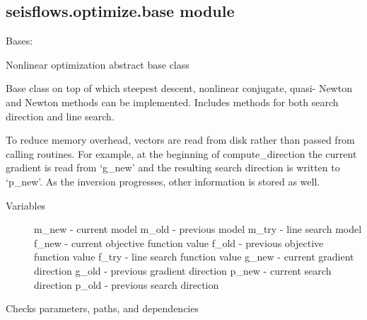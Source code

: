 \documentclass[letterpaper,10pt,english]{sphinxmanual}
\begin{document}
\subsection{seisflows.optimize.base module}
\label{\detokenize{ref/seisflows.optimize:module-seisflows.optimize.base}}\label{\detokenize{ref/seisflows.optimize:seisflows-optimize-base-module}}

\begin{fulllineitems}
\label{\detokenize{ref/seisflows.optimize:seisflows.optimize.base.base}}
Bases: 

Nonlinear optimization abstract base class

Base class on top of which steepest descent, nonlinear conjugate, quasi-
Newton and Newton methods can be implemented.  Includes methods for
both search direction and line search.

To reduce memory overhead, vectors are read from disk rather than passed
from calling routines. For example, at the beginning of compute\_direction
the current gradient is  read from  ‘g\_new’ and the resulting search
direction is written to ‘p\_new’. As the inversion progresses, other
information is stored as well.
\begin{description}
\item[{Variables}] \leavevmode
m\_new - current model
m\_old - previous model
m\_try - line search model
f\_new - current objective function value
f\_old - previous objective function value
f\_try - line search function value
g\_new - current gradient direction
g\_old - previous gradient direction
p\_new - current search direction
p\_old - previous search direction

\end{description}

\begin{fulllineitems}
\label{\detokenize{ref/seisflows.optimize:seisflows.optimize.base.base.check}}
Checks parameters, paths, and dependencies


\end{fulllineitems}
\end{fulllineitems}
\end{document}
